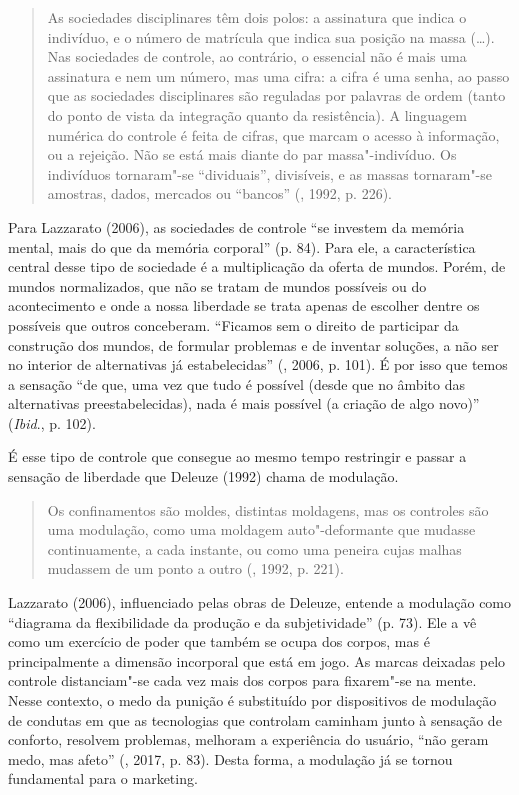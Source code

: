 \begin{quote}
As sociedades disciplinares têm dois polos: a assinatura que indica o
indivíduo, e o número de matrícula que indica sua posição na massa
(\ldots{}). Nas sociedades de controle, ao contrário, o essencial não é mais
uma assinatura e nem um número, mas uma cifra: a cifra é uma senha, ao
passo que as sociedades disciplinares são reguladas por palavras de
ordem (tanto do ponto de vista da integração quanto da resistência). A
linguagem numérica do controle é feita de cifras, que marcam o acesso à
informação, ou a rejeição. Não se está mais diante do par
massa"-indivíduo. Os indivíduos tornaram"-se ``dividuais'', divisíveis, e
as massas tornaram"-se amostras, dados, mercados ou ``bancos'' (,
1992, p. 226).
\end{quote}

Para Lazzarato (2006), as sociedades de controle ``se investem da memória mental, mais do que
da memória corporal'' (p. 84). Para ele, a característica central desse
tipo de sociedade é a multiplicação da oferta de mundos. Porém, de
mundos normalizados, que não se tratam de mundos possíveis ou do
acontecimento e onde a nossa liberdade se trata apenas de escolher
dentre os possíveis que outros conceberam. ``Ficamos sem o direito de
participar da construção dos mundos, de formular problemas e de inventar
soluções, a não ser no interior de alternativas já estabelecidas''
(, 2006, p. 101).
É por isso que temos a sensação ``de que, uma vez que tudo é possível
(desde que no âmbito das alternativas preestabelecidas), nada é mais
possível (a criação de algo novo)'' (\emph{Ibid}., p. 102).

É esse tipo de controle que consegue ao mesmo tempo restringir e passar
a sensação de liberdade que Deleuze (1992) chama de modulação.

\begin{quote}
Os confinamentos são moldes, distintas moldagens, mas os controles são
uma modulação, como uma moldagem auto"-deformante que mudasse
continuamente, a cada instante, ou como uma peneira cujas malhas
mudassem de um ponto a outro (, 1992, p. 221).
\end{quote}

Lazzarato (2006), influenciado pelas obras de Deleuze, entende a
modulação como ``diagrama da flexibilidade da produção e da
subjetividade'' (p. 73). Ele a vê como um exercício de poder que também se
ocupa dos corpos, mas é principalmente a dimensão incorporal que está em
jogo. As marcas deixadas pelo controle distanciam"-se cada vez mais dos
corpos para fixarem"-se na mente. Nesse contexto, o medo da punição é
substituído por dispositivos de modulação de condutas em que as
tecnologias que controlam caminham junto à sensação de conforto,
resolvem problemas, melhoram a experiência do usuário, ``não geram medo,
mas afeto'' (, 2017, p. 83). Desta forma, a modulação já se tornou
fundamental para o marketing.


